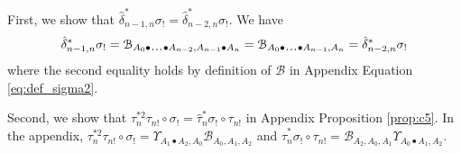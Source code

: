 First, we show that $\hat{\delta}_{n-1,n}^*
\sigma_! = \hat{\delta}_{n-2,n}^*\sigma_!$. 
We have
\begin{align*}
\hat{\delta}_{n-1,n}^*\sigma_!
=
\mathcal{B}_{A_0 \bullet \smdots \bullet A_{n-2},
  A_{n-1}\bullet A_n}
= \mathcal{B}_{A_0 \bullet \smdots \bullet A_{n-1},A_n} 
= \hat{\delta}_{n-2,n}^*\sigma_!
\end{align*}
where the second equality holds by definition 
of $\mathcal{B}$ in Appendix Equation 
\ref{eq:def_sigma2}.

Second, we show that $\tau_n^{*2}\tau_{n!} 
\circ \sigma_! = \hat{\tau}_n^*\sigma_!
\circ \tau_{n!}$ in Appendix Proposition 
\ref{prop:c5}. In the appendix, $\tau_n^{*2}
\tau_{n!} \circ \sigma_! = \Upsilon_{A_1\bullet A_2,A_0} 
\mathcal{B}_{A_0,A_1,A_2}$ and $\hat{\tau}_n^*
\sigma_!\circ \tau_{n!} = \mathcal{B}_{A_2,A_0,A_1} 
\Upsilon_{A_0 \bullet A_1, A_2}$.
%
